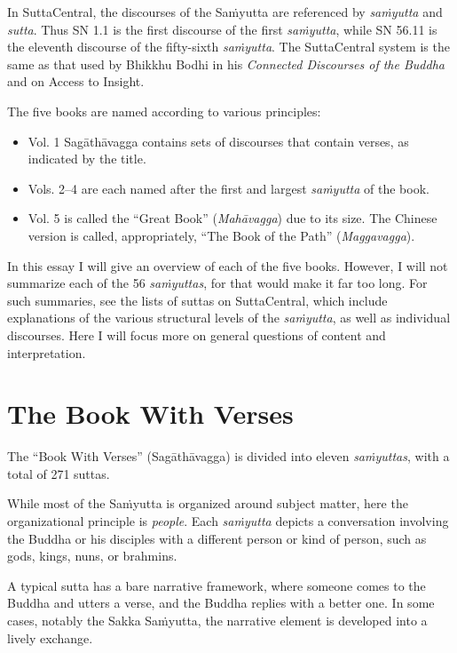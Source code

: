 \documentclass[12pt,openany]{book}%
\begin{document}
In SuttaCentral, the discourses of the \textsanskrit{Saṁyutta} are referenced by \textit{\textsanskrit{saṁyutta}} and \textit{sutta}. Thus SN 1.1 is the first discourse of the first \textit{\textsanskrit{saṁyutta}}, while SN 56.11 is the eleventh discourse of the fifty-sixth \textit{\textsanskrit{saṁyutta}}. The SuttaCentral system is the same as that used by Bhikkhu Bodhi in his \textit{Connected Discourses of the Buddha} and on Access to Insight.

The five books are named according to various principles:

\begin{itemize}%
\item Vol. 1 \textsanskrit{Sagāthāvagga} contains sets of discourses that contain verses, as indicated by the title.%
\item Vols. 2–4 are each named after the first and largest \textit{\textsanskrit{saṁyutta}} of the book.%
\item Vol. 5 is called the “Great Book” (\textit{\textsanskrit{Mahāvagga}}) due to its size. The Chinese version is called, appropriately, “The Book of the Path” (\textit{Maggavagga}).%
\end{itemize}

In this essay I will give an overview of each of the five books. However, I will not summarize each of the 56 \textit{\textsanskrit{saṁyuttas}}, for that would make it far too long. For such summaries, see the lists of suttas on SuttaCentral, which include explanations of the various structural levels of the \textit{\textsanskrit{saṁyutta}}, as well as individual discourses. Here I will focus more on general questions of content and interpretation.

\section*{The Book With Verses}

The “Book With Verses” (\textsanskrit{Sagāthāvagga}) is divided into eleven \textit{\textsanskrit{saṁyuttas}}, with a total of 271 suttas.

While most of the \textsanskrit{Saṁyutta} is organized around subject matter, here the organizational principle is \emph{people}. Each \textit{\textsanskrit{saṁyutta}} depicts a conversation involving the Buddha or his disciples with a different person or kind of person, such as gods, kings, nuns, or brahmins.

A typical sutta has a bare narrative framework, where someone comes to the Buddha and utters a verse, and the Buddha replies with a better one. In some cases, notably the Sakka \textsanskrit{Saṁyutta}, the narrative element is developed into a lively exchange.
\end{document}
